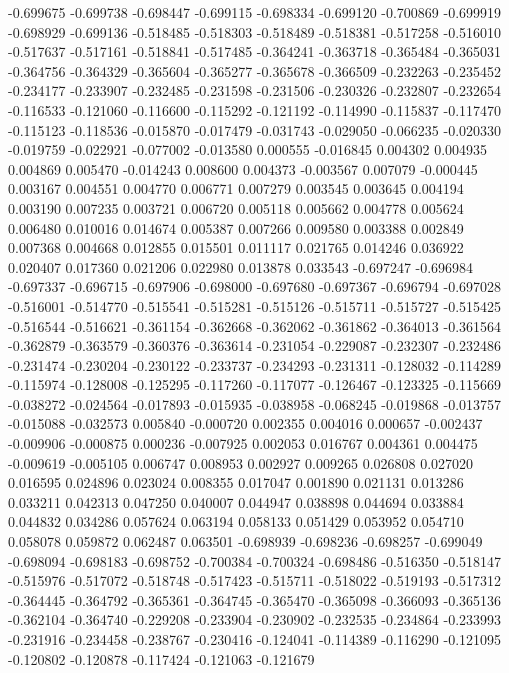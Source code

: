 -0.699675
-0.699738
-0.698447
-0.699115
-0.698334
-0.699120
-0.700869
-0.699919
-0.698929
-0.699136
-0.518485
-0.518303
-0.518489
-0.518381
-0.517258
-0.516010
-0.517637
-0.517161
-0.518841
-0.517485
-0.364241
-0.363718
-0.365484
-0.365031
-0.364756
-0.364329
-0.365604
-0.365277
-0.365678
-0.366509
-0.232263
-0.235452
-0.234177
-0.233907
-0.232485
-0.231598
-0.231506
-0.230326
-0.232807
-0.232654
-0.116533
-0.121060
-0.116600
-0.115292
-0.121192
-0.114990
-0.115837
-0.117470
-0.115123
-0.118536
-0.015870
-0.017479
-0.031743
-0.029050
-0.066235
-0.020330
-0.019759
-0.022921
-0.077002
-0.013580
0.000555
-0.016845
0.004302
0.004935
0.004869
0.005470
-0.014243
0.008600
0.004373
-0.003567
0.007079
-0.000445
0.003167
0.004551
0.004770
0.006771
0.007279
0.003545
0.003645
0.004194
0.003190
0.007235
0.003721
0.006720
0.005118
0.005662
0.004778
0.005624
0.006480
0.010016
0.014674
0.005387
0.007266
0.009580
0.003388
0.002849
0.007368
0.004668
0.012855
0.015501
0.011117
0.021765
0.014246
0.036922
0.020407
0.017360
0.021206
0.022980
0.013878
0.033543
-0.697247
-0.696984
-0.697337
-0.696715
-0.697906
-0.698000
-0.697680
-0.697367
-0.696794
-0.697028
-0.516001
-0.514770
-0.515541
-0.515281
-0.515126
-0.515711
-0.515727
-0.515425
-0.516544
-0.516621
-0.361154
-0.362668
-0.362062
-0.361862
-0.364013
-0.361564
-0.362879
-0.363579
-0.360376
-0.363614
-0.231054
-0.229087
-0.232307
-0.232486
-0.231474
-0.230204
-0.230122
-0.233737
-0.234293
-0.231311
-0.128032
-0.114289
-0.115974
-0.128008
-0.125295
-0.117260
-0.117077
-0.126467
-0.123325
-0.115669
-0.038272
-0.024564
-0.017893
-0.015935
-0.038958
-0.068245
-0.019868
-0.013757
-0.015088
-0.032573
0.005840
-0.000720
0.002355
0.004016
0.000657
-0.002437
-0.009906
-0.000875
0.000236
-0.007925
0.002053
0.016767
0.004361
0.004475
-0.009619
-0.005105
0.006747
0.008953
0.002927
0.009265
0.026808
0.027020
0.016595
0.024896
0.023024
0.008355
0.017047
0.001890
0.021131
0.013286
0.033211
0.042313
0.047250
0.040007
0.044947
0.038898
0.044694
0.033884
0.044832
0.034286
0.057624
0.063194
0.058133
0.051429
0.053952
0.054710
0.058078
0.059872
0.062487
0.063501
-0.698939
-0.698236
-0.698257
-0.699049
-0.698094
-0.698183
-0.698752
-0.700384
-0.700324
-0.698486
-0.516350
-0.518147
-0.515976
-0.517072
-0.518748
-0.517423
-0.515711
-0.518022
-0.519193
-0.517312
-0.364445
-0.364792
-0.365361
-0.364745
-0.365470
-0.365098
-0.366093
-0.365136
-0.362104
-0.364740
-0.229208
-0.233904
-0.230902
-0.232535
-0.234864
-0.233993
-0.231916
-0.234458
-0.238767
-0.230416
-0.124041
-0.114389
-0.116290
-0.121095
-0.120802
-0.120878
-0.117424
-0.121063
-0.121679
